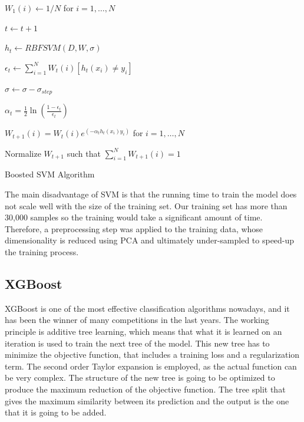 \documentclass[conference]{IEEEtran}
\begin{document}
\begin{algorithm}
  
  $W_1(i) \leftarrow 1/N$ for $i=1,\dots,N$ %
  
    {
        $t \leftarrow t+1$
        
        $h_t \leftarrow RBFSVM(D,W,\sigma)$ 
        
        $\epsilon_t \leftarrow \sum^N_{i=1}W_t(i)[h_t(x_i)\neq y_i]$
        
        		{
		
		$\sigma \leftarrow \sigma - \sigma_{step}$
		
		}
	\Else
	{
	$\alpha_t = \frac{1}{2}\ln \left( \frac{1-\epsilon_t}{\epsilon_t} \right)$
	
	  
	 $W_{t+1}(i) = W_t(i) e^{(-\alpha_th_t(x_i)y_i)}$ for $i=1,\dots,N$
	 
	 Normalize $W_{t+1}$ such that $\sum^N_{i=1}W_{t+1}(i)=1$
	 }
    }
\caption{Boosted SVM Algorithm}
\end{algorithm}

The main disadvantage of SVM is that the running time to train the model does not scale well with the size of the training set\cite{boosting_svm}. Our training set has more than 30,000 samples so the training would take a significant amount of time. Therefore, a preprocessing step was applied to the training data, whose dimensionality is reduced using PCA and ultimately under-sampled to speed-up the training process. 

\subsection{XGBoost}
XGBoost is one of the most effective classification algorithms nowadays, and it has been the winner of many competitions in the last years. The working principle is additive tree learning, which means that what it is learned on an iteration is used to train the next tree of the model. This new tree has to minimize the objective function, that includes a training loss and a regularization term. The second order Taylor expansion is employed, as the actual function can be very complex. The structure of the new tree is going to be optimized to produce the maximum reduction of the objective function. The tree split that gives the maximum similarity between its prediction and the output is the one that it is going to be added. 
\end{document}
